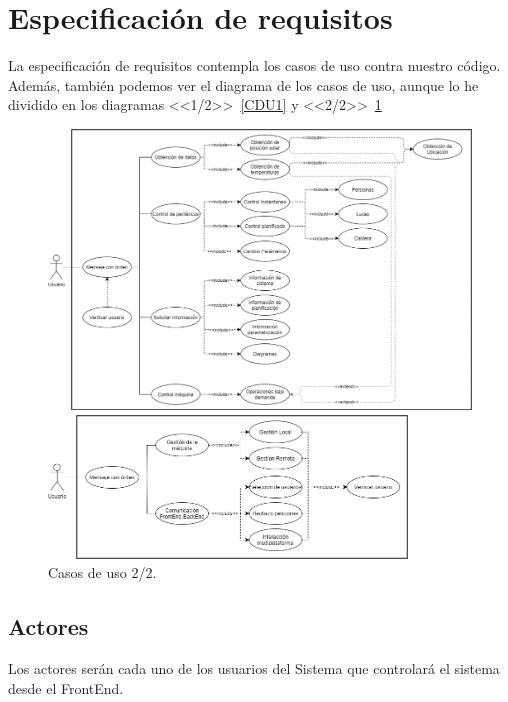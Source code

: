 \section{Especificación de requisitos}
La especificación de requisitos contempla los casos de uso contra nuestro código.
Además, también podemos ver el diagrama de los casos de uso, aunque lo he dividido en los diagramas <<1/2>>~\ref{CDU1} y <<2/2>>~\ref{CDU2}

\begin{figure}[h]
\includegraphics[width=1.15\textwidth]{img/Diagramas/CasosDeUso.png}
\caption{Casos de uso 1/2.}\label{CDU1}
\includegraphics[width=0.85\textwidth]{img/Diagramas/CasosDeUsoBackEnd.png}
\caption{Casos de uso 2/2.}\label{CDU2}
\end{figure}

\subsection{Actores}
Los actores serán cada uno de los usuarios del Sistema que controlará el sistema desde el FrontEnd.

